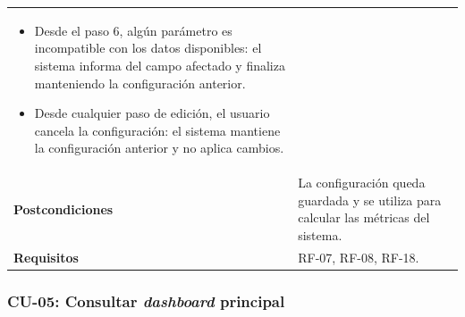 {\begin{longtable}{p{3.2cm}p{10.2cm}}
\begin{minipage}[t]{10.2cm}
\begin{itemize}[noitemsep,leftmargin=*]
    \item Desde el paso 6, algún parámetro es incompatible con los datos disponibles: el sistema informa del campo afectado y finaliza manteniendo la configuración anterior.
    \item Desde cualquier paso de edición, el usuario cancela la configuración: el sistema mantiene la configuración anterior y no aplica cambios.
\end{itemize}\end{minipage} \\
\textbf{Postcondiciones} & La configuración queda guardada y se utiliza para calcular las métricas del sistema. \\
\textbf{Requisitos} & RF-07, RF-08, RF-18. \\
\bottomrule
\end{longtable}
\vspace{0.45em}
}

\clearpage
\subsubsection{CU-05: Consultar \textit{dashboard} principal}

